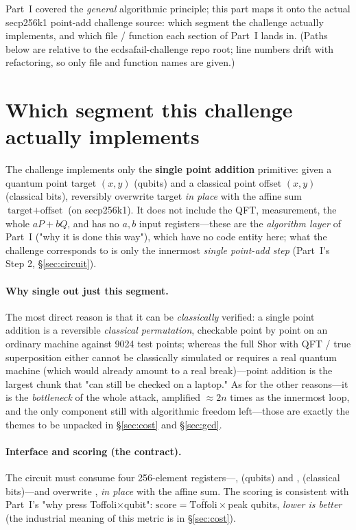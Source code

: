 \documentclass[11pt]{article}
\newcommand{\secref}[1]{\hyperref[#1]{\S\ref*{#1}}}
\begin{document}
Part~I covered the \emph{general} algorithmic principle; this part maps it onto the actual secp256k1 point-add challenge source: which segment the challenge actually implements,
and which file / function each section of Part~I lands in. (Paths below are relative to the ecdsafail-challenge repo root; line numbers drift with refactoring, so only file and function names are given.)

\section{Which segment this challenge actually implements}
\label{sec:target}

The challenge implements only the \textbf{single point addition} primitive: given a quantum point target $(x,y)$ (qubits) and a classical point offset $(x,y)$ (classical
bits), reversibly overwrite target \emph{in place} with the affine sum $\text{target}+\text{offset}$ (on secp256k1). It does not include the QFT,
measurement, the whole $aP+bQ$, and has no $a,b$ input registers---these are the \emph{algorithm layer} of Part~I ("why it is done this way"), which have no code entity here;
what the challenge corresponds to is only the innermost \emph{single point-add step} (Part~I's Step 2, \secref{sec:circuit}).

\paragraph{Why single out just this segment.}
The most direct reason is that it can be \emph{classically} verified: a single point addition is a reversible \emph{classical permutation}, checkable point by point on an ordinary machine against 9024 test points; whereas
the full Shor with QFT / true superposition either cannot be classically simulated or requires a real quantum machine (which would already amount to a real break)---point addition is the largest chunk that "can still be checked on a laptop."
As for the other reasons---it is the \emph{bottleneck} of the whole attack, amplified $\approx 2n$ times as the innermost loop, and the only component still with algorithmic
freedom left---those are exactly the themes to be unpacked in \secref{sec:cost} and \secref{sec:gcd}.

\paragraph{Interface and scoring (the contract).}The circuit must consume four 256-element registers---,  (qubits) and
,  (classical bits)---and overwrite ,  \emph{in place} with the
affine sum. The scoring is consistent with Part~I's "why press Toffoli$\times$qubit": $\text{score}=\overline{\text{Toffoli}}\times$peak qubits,
\emph{lower is better} (the industrial meaning of this metric is in \secref{sec:cost}).
\end{document}
